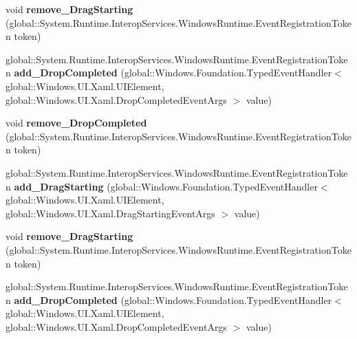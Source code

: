 \begin{DoxyCompactItemize}
void {\bfseries remove\+\_\+\+Drag\+Starting} (global\+::\+System.\+Runtime.\+Interop\+Services.\+Windows\+Runtime.\+Event\+Registration\+Token token)
\item 
\mbox{\label{interface_windows_1_1_u_i_1_1_xaml_1_1_i_u_i_element3_aa1dd03e3acd153862a9ab2a172d49cd0}} 
global\+::\+System.\+Runtime.\+Interop\+Services.\+Windows\+Runtime.\+Event\+Registration\+Token {\bfseries add\+\_\+\+Drop\+Completed} (global\+::\+Windows.\+Foundation.\+Typed\+Event\+Handler$<$ global\+::\+Windows.\+U\+I.\+Xaml.\+U\+I\+Element, global\+::\+Windows.\+U\+I.\+Xaml.\+Drop\+Completed\+Event\+Args $>$ value)
\item 
\mbox{\label{interface_windows_1_1_u_i_1_1_xaml_1_1_i_u_i_element3_ab5b2415864634b87ef93d36e64e197a5}} 
void {\bfseries remove\+\_\+\+Drop\+Completed} (global\+::\+System.\+Runtime.\+Interop\+Services.\+Windows\+Runtime.\+Event\+Registration\+Token token)
\item 
\mbox{\label{interface_windows_1_1_u_i_1_1_xaml_1_1_i_u_i_element3_a65b4b6369aa0a951c30016151b14ac95}} 
global\+::\+System.\+Runtime.\+Interop\+Services.\+Windows\+Runtime.\+Event\+Registration\+Token {\bfseries add\+\_\+\+Drag\+Starting} (global\+::\+Windows.\+Foundation.\+Typed\+Event\+Handler$<$ global\+::\+Windows.\+U\+I.\+Xaml.\+U\+I\+Element, global\+::\+Windows.\+U\+I.\+Xaml.\+Drag\+Starting\+Event\+Args $>$ value)
\item 
\mbox{\label{interface_windows_1_1_u_i_1_1_xaml_1_1_i_u_i_element3_a9763c1f3007106faa5edbab72152e864}} 
void {\bfseries remove\+\_\+\+Drag\+Starting} (global\+::\+System.\+Runtime.\+Interop\+Services.\+Windows\+Runtime.\+Event\+Registration\+Token token)
\item 
\mbox{\label{interface_windows_1_1_u_i_1_1_xaml_1_1_i_u_i_element3_aa1dd03e3acd153862a9ab2a172d49cd0}} 
global\+::\+System.\+Runtime.\+Interop\+Services.\+Windows\+Runtime.\+Event\+Registration\+Token {\bfseries add\+\_\+\+Drop\+Completed} (global\+::\+Windows.\+Foundation.\+Typed\+Event\+Handler$<$ global\+::\+Windows.\+U\+I.\+Xaml.\+U\+I\+Element, global\+::\+Windows.\+U\+I.\+Xaml.\+Drop\+Completed\+Event\+Args $>$ value)

\end{DoxyCompactItemize}
